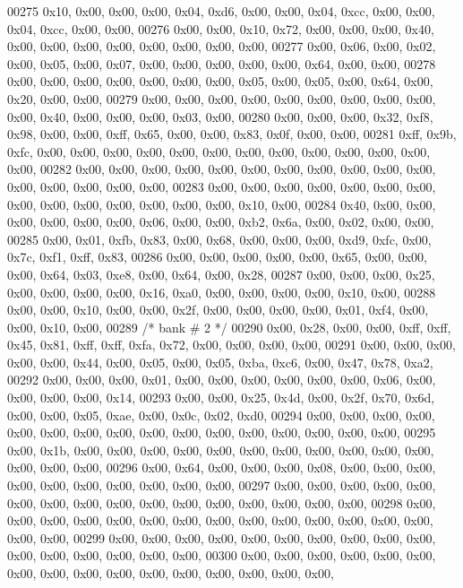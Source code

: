 \begin{DoxyCode}
00275     0x10, 0x00, 0x00, 0x00, 0x04, 0xd6, 0x00, 0x00, 0x04, 0xcc, 0x00, 0x00, 0x04, 0xcc, 0x00, 0x00,
00276     0x00, 0x00, 0x10, 0x72, 0x00, 0x00, 0x00, 0x40, 0x00, 0x00, 0x00, 0x00, 0x00, 0x00, 0x00, 0x00,
00277     0x00, 0x06, 0x00, 0x02, 0x00, 0x05, 0x00, 0x07, 0x00, 0x00, 0x00, 0x00, 0x00, 0x64, 0x00, 0x00,
00278     0x00, 0x00, 0x00, 0x00, 0x00, 0x00, 0x00, 0x05, 0x00, 0x05, 0x00, 0x64, 0x00, 0x20, 0x00, 0x00,
00279     0x00, 0x00, 0x00, 0x00, 0x00, 0x00, 0x00, 0x00, 0x00, 0x00, 0x40, 0x00, 0x00, 0x00, 0x03, 0x00,
00280     0x00, 0x00, 0x00, 0x32, 0xf8, 0x98, 0x00, 0x00, 0xff, 0x65, 0x00, 0x00, 0x83, 0x0f, 0x00, 0x00,
00281     0xff, 0x9b, 0xfc, 0x00, 0x00, 0x00, 0x00, 0x00, 0x00, 0x00, 0x00, 0x00, 0x00, 0x00, 0x00, 0x00,
00282     0x00, 0x00, 0x00, 0x00, 0x00, 0x00, 0x00, 0x00, 0x00, 0x00, 0x00, 0x00, 0x00, 0x00, 0x00, 0x00,
00283     0x00, 0x00, 0x00, 0x00, 0x00, 0x00, 0x00, 0x00, 0x00, 0x00, 0x00, 0x00, 0x00, 0x00, 0x10, 0x00,
00284     0x40, 0x00, 0x00, 0x00, 0x00, 0x00, 0x00, 0x06, 0x00, 0x00, 0xb2, 0x6a, 0x00, 0x02, 0x00, 0x00,
00285     0x00, 0x01, 0xfb, 0x83, 0x00, 0x68, 0x00, 0x00, 0x00, 0xd9, 0xfc, 0x00, 0x7c, 0xf1, 0xff, 0x83,
00286     0x00, 0x00, 0x00, 0x00, 0x00, 0x65, 0x00, 0x00, 0x00, 0x64, 0x03, 0xe8, 0x00, 0x64, 0x00, 0x28,
00287     0x00, 0x00, 0x00, 0x25, 0x00, 0x00, 0x00, 0x00, 0x16, 0xa0, 0x00, 0x00, 0x00, 0x00, 0x10, 0x00,
00288     0x00, 0x00, 0x10, 0x00, 0x00, 0x2f, 0x00, 0x00, 0x00, 0x00, 0x01, 0xf4, 0x00, 0x00, 0x10, 0x00,
00289     \textcolor{comment}{/* bank # 2 */}
00290     0x00, 0x28, 0x00, 0x00, 0xff, 0xff, 0x45, 0x81, 0xff, 0xff, 0xfa, 0x72, 0x00, 0x00, 0x00, 0x00,
00291     0x00, 0x00, 0x00, 0x00, 0x00, 0x44, 0x00, 0x05, 0x00, 0x05, 0xba, 0xc6, 0x00, 0x47, 0x78, 0xa2,
00292     0x00, 0x00, 0x00, 0x01, 0x00, 0x00, 0x00, 0x00, 0x00, 0x00, 0x06, 0x00, 0x00, 0x00, 0x00, 0x14,
00293     0x00, 0x00, 0x25, 0x4d, 0x00, 0x2f, 0x70, 0x6d, 0x00, 0x00, 0x05, 0xae, 0x00, 0x0c, 0x02, 0xd0,
00294     0x00, 0x00, 0x00, 0x00, 0x00, 0x00, 0x00, 0x00, 0x00, 0x00, 0x00, 0x00, 0x00, 0x00, 0x00, 0x00,
00295     0x00, 0x1b, 0x00, 0x00, 0x00, 0x00, 0x00, 0x00, 0x00, 0x00, 0x00, 0x00, 0x00, 0x00, 0x00, 0x00,
00296     0x00, 0x64, 0x00, 0x00, 0x00, 0x08, 0x00, 0x00, 0x00, 0x00, 0x00, 0x00, 0x00, 0x00, 0x00, 0x00,
00297     0x00, 0x00, 0x00, 0x00, 0x00, 0x00, 0x00, 0x00, 0x00, 0x00, 0x00, 0x00, 0x00, 0x00, 0x00, 0x00,
00298     0x00, 0x00, 0x00, 0x00, 0x00, 0x00, 0x00, 0x00, 0x00, 0x00, 0x00, 0x00, 0x00, 0x00, 0x00, 0x00,
00299     0x00, 0x00, 0x00, 0x00, 0x00, 0x00, 0x00, 0x00, 0x00, 0x00, 0x00, 0x00, 0x00, 0x00, 0x00, 0x00,
00300     0x00, 0x00, 0x00, 0x00, 0x00, 0x00, 0x00, 0x00, 0x00, 0x00, 0x00, 0x00, 0x00, 0x00, 0x00, 0x00,

\end{DoxyCode}
